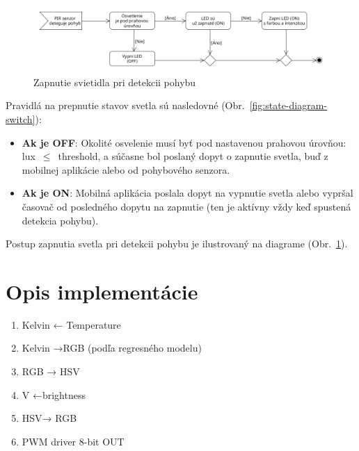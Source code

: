 \documentclass[12pt, a4paper]{article}
\begin{document}
\begin{figure}[h]
    \centering
	\includegraphics[width=\textwidth]{assets/pir-motion-detect.png}
	\caption{Zapnutie svietidla pri detekcii pohybu}
	\label{fig:pir-motion-detect}
\end{figure}

Pravidlá na prepnutie stavov svetla sú nasledovné (Obr.~\ref{fig:state-diagram-switch}):
\begin{itemize}
\item \textbf{Ak je OFF}: Okolité osvelenie musí byť pod nastavenou prahovou úrovňou: lux~$\leq$~threshold, a súčasne bol poslaný dopyt o zapnutie svetla, buď z mobilnej aplikácie alebo od pohybového senzora.
\item \textbf{Ak je ON}: Mobilná aplikácia poslala dopyt na vypnutie svetla alebo vypršal časovač od posledného dopytu na zapnutie (ten je aktívny vždy keď spustená detekcia pohybu).
\end{itemize}
Postup zapnutia svetla pri detekcii pohybu je ilustrovaný na diagrame (Obr.~\ref{fig:pir-motion-detect}).




\section{Opis implementácie}

\begin{enumerate}
\item Kelvin ← Temperature
\item Kelvin →RGB (podľa regresného modelu)
\item RGB → HSV
\item V ←brightness
\item HSV→ RGB
\item PWM driver 8-bit OUT
\end{enumerate}
\end{document}
